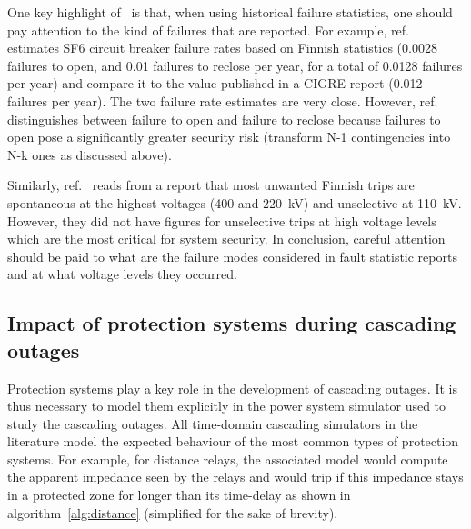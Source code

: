 \begin{tcolorbox}[width=\linewidth, %
    colback=red!5!white,
    colframe=red!75!black,
    breakable,
    title=Note]
One key highlight of~\cite{GridPSA} is that, when using historical failure statistics, one should pay attention to the kind of failures that are reported. For example, ref.~\cite{GridPSA} estimates SF6 circuit breaker failure rates based on Finnish statistics (0.0028 failures to open, and 0.01 failures to reclose per year, for a total of 0.0128 failures per year) and compare it to the value published in a CIGRE report (0.012 failures per year). The two failure rate estimates are very close. However, ref.~\cite{GridPSA} distinguishes between failure to open and failure to reclose because failures to open pose a significantly greater security risk (transform N-1 contingencies into N-k ones as discussed above).

Similarly, ref.~\cite{GridPSA} reads from a report that most unwanted Finnish trips are spontaneous at the highest voltages (400 and 220~kV) and unselective at 110~kV. However, they did not have figures for unselective trips at high voltage levels which are the most critical for system security. In conclusion, careful attention should be paid to what are the failure modes considered in fault statistic reports and at what voltage levels they occurred.
\end{tcolorbox}



\subsection{Impact of protection systems during cascading outages}
\label{sec:protection_cascade}

Protection systems play a key role in the development of cascading outages. It is thus necessary to model them explicitly in the power system simulator used to study the cascading outages. All time-domain cascading simulators in the literature model the expected behaviour of the most common types of protection systems. For example, for distance relays, the associated model would compute the apparent impedance seen by the relays and would trip if this impedance stays in a protected zone for longer than its time-delay as shown in algorithm~\ref{alg:distance} (simplified for the sake of brevity). %

